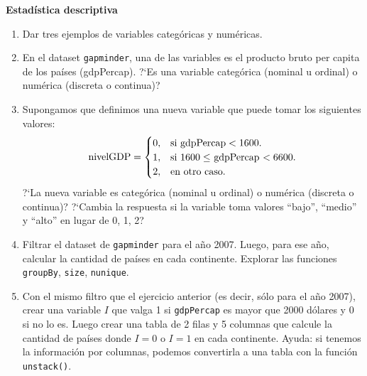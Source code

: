 \documentclass[a4paper,11pt]{article}
\theoremstyle{definition}
\begin{document}
\textbf{\large Estad\'istica descriptiva}
\begin{enumerate}[resume]

\item Dar tres ejemplos de variables categ\'oricas y num\'ericas.

\item En el dataset \lstinline{gapminder}, una de las variables es el producto bruto per capita de los pa\'ises (gdpPercap). ?`Es una variable categ\'orica (nominal u ordinal) o num\'erica (discreta o continua)?

\item Supongamos que definimos una nueva variable que puede tomar los siguientes valores:
\[
\text{nivelGDP} = \begin{cases}
0, & \text{si \lstinline{gdpPercap}} < 1600. \\
1, & \text{si $1600 \le $ \lstinline{gdpPercap} $< 6600$}. \\
2, & \text{en otro caso.} \\
\end{cases}
\]
?`La nueva variable
 es categ\'orica (nominal u ordinal) o num\'erica (discreta o continua)? ?`Cambia la respuesta si la variable
 toma valores ``bajo'', ``medio'' y ``alto'' en lugar de 0, 1, 2?

\item Filtrar el dataset de \lstinline{gapminder} para el a\~no 2007. Luego, para ese a\~no, calcular la cantidad de pa\'ises en cada continente. Explorar las funciones \lstinline{groupBy}, \lstinline{size}, \lstinline{nunique}.

\item Con el mismo filtro que el ejercicio anterior (es decir, s\'olo para el a\~no 2007), crear una variable $I$
 que valga 1 si \lstinline{gdpPercap} es mayor que 2000 d\'olares y 0 si no lo es. Luego crear una tabla de 2 filas y 5 columnas que calcule la cantidad de pa\'ises donde $I = 0$ o $I = 1$
 en cada continente. Ayuda: si tenemos la información por columnas, podemos convertirla a una tabla con la función \lstinline{unstack()}.



\end{enumerate}
\end{document}
